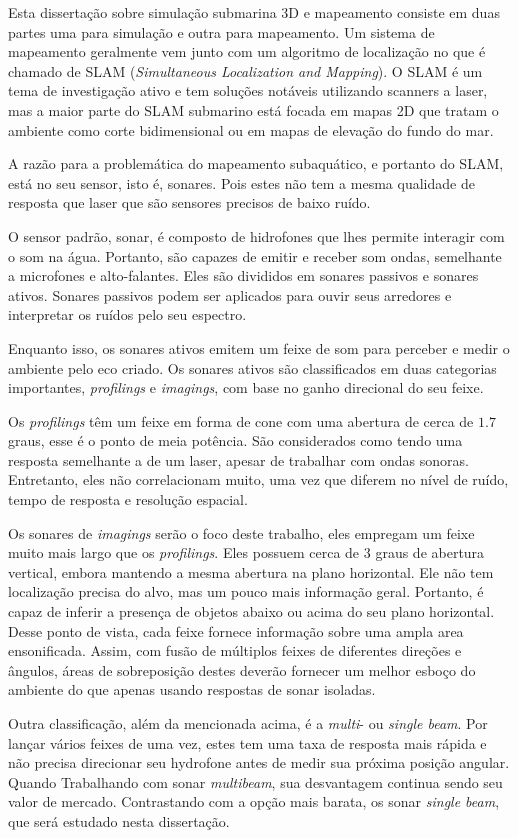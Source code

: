 Esta dissertação sobre simulação submarina 3D e mapeamento consiste em duas
partes uma para simulação e outra para mapeamento. Um sistema de mapeamento
geralmente vem junto com um algoritmo de localização no que é chamado de SLAM
(\textit{Simultaneous Localization and Mapping}). O SLAM é um tema de
investigação ativo e tem soluções notáveis utilizando scanners a laser, mas a
maior parte do SLAM submarino está focada em mapas 2D que tratam o ambiente como
corte bidimensional ou em mapas de elevação do fundo do mar.

A razão para a problemática do mapeamento subaquático, e portanto do SLAM, está
no seu sensor, isto é, sonares. Pois estes não tem a mesma qualidade de resposta
que laser que são sensores precisos de baixo ruído.

O sensor padrão, sonar, é composto de hidrofones que lhes permite interagir com
o som na água. Portanto, são capazes de emitir e receber som ondas,
semelhante a microfones e alto-falantes. Eles são divididos em sonares passivos e sonares
ativos. Sonares passivos podem ser aplicados para ouvir seus arredores
e interpretar os ruídos pelo seu espectro.

Enquanto isso, os sonares ativos emitem um feixe de som para perceber e medir o
ambiente pelo eco criado. Os sonares ativos são classificados em duas categorias
importantes, \textit{profilings} e \textit{imagings}, com base no ganho
direcional do seu feixe.

Os \emph{profilings} têm um feixe em forma de cone com uma abertura de cerca de
$ 1.7 $ graus, esse é o ponto de meia potência. São considerados como tendo uma
resposta semelhante a de um laser, apesar de trabalhar com ondas sonoras.
Entretanto, eles não correlacionam muito, uma vez que diferem no nível de ruído,
tempo de resposta e resolução espacial.

Os sonares de \textit{imagings} serão o foco deste trabalho, eles empregam um
feixe muito mais largo que os \emph{profilings}. Eles possuem cerca de $ 3 $
graus de abertura vertical, embora mantendo a mesma abertura na plano
horizontal.
Ele não tem localização precisa do alvo, mas um pouco mais informação geral.
Portanto, é capaz de inferir a presença de objetos abaixo ou acima do seu
plano horizontal.
Desse ponto de vista, cada feixe fornece informação sobre uma ampla area
ensonificada.
Assim, com fusão de múltiplos feixes de diferentes direções e ângulos, áreas de
sobreposição destes deverão fornecer um melhor esboço do ambiente do que
apenas usando respostas de sonar isoladas.

Outra classificação, além da mencionada acima, é a \textit{multi}- ou
\textit{single beam}. Por lançar vários feixes de uma vez, estes tem uma taxa de
resposta mais rápida e não precisa direcionar seu hydrofone antes de medir sua
próxima posição angular. Quando Trabalhando com sonar \textit{multibeam}, sua
desvantagem continua sendo seu valor de mercado. Contrastando com a opção mais
barata, os sonar \textit{single beam}, que será estudado nesta dissertação.